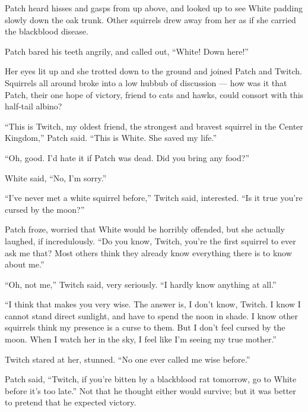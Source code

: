 \documentclass[ebook,oneside,openany,17pt]{memoir}
\newenvironment{tolerant}[1]{%
  \par\tolerance=#1\relax
}{%
  \par
}
\begin{document}
\begin{tolerant}{500}
Patch heard hisses and gasps from up above, and looked up to see White
padding slowly down the oak trunk. Other squirrels drew away from her
as if she carried the blackblood disease.
\end{tolerant}

\begin{tolerant}{1000}
Patch bared his teeth angrily, and called out, “White! Down here!”
\end{tolerant}

\begin{tolerant}{1000}
Her eyes lit up and she trotted down to the ground and joined Patch
and Twitch. Squirrels all around broke into a low hubbub of discussion
— how was it that Patch, their one hope of victory, friend to cats and
hawks, could consort with this half-tail albino?
\end{tolerant}

“This is Twitch, my oldest friend, the strongest and bravest squirrel
in the Center Kingdom,” Patch said. “This is White. She saved my
life.”

“Oh, good. I’d hate it if Patch was dead. Did you bring any food?”

White said, “No, I’m sorry.”

“I’ve never met a white squirrel before,” Twitch said, interested. “Is
it true you’re cursed by the moon?”

Patch froze, worried that White would be horribly offended, but she
actually laughed, if incredulously. “Do you know, Twitch, you’re the
first squirrel to ever ask me that? Most others think they already
know everything there is to know about me.”

\begin{tolerant}{500}
“Oh, not me,” Twitch said, very seriously. “I hard\-ly know anything at
all.”
\end{tolerant}

“I think that makes you very wise. The answer is, I don’t know,
Twitch. I know I cannot stand direct sunlight, and have to spend the
noon in shade. I know other squirrels think my presence is a curse to
them. But I don’t feel cursed by the moon. When I watch her in the
sky, I feel like I’m seeing my true mother.”

Twitch stared at her, stunned. “No one ever called me wise before.”

Patch said, “Twitch, if you’re bitten by a blackblood rat tomorrow, go
to White before it’s too late.” Not that he thought either would
survive; but it was better to pretend that he expected victory.
\end{document}
